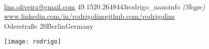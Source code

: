 \documentclass[10pt,a4paper]{article}
\begin{document}

\sloppy  %


\begin{minipage}{.70\linewidth}
\nobreakvspace{0.3em}  %
\\
\href{mailto:lins.oliveira.at.gmail.com}{lins.oliveira\mbox{}@\mbox{}gmail.com}
\sbull\textsmaller{+}49.1520.2648443\sbull rodrigo\_nanoinfo \emph{(Skype)} \\
\href{https://www.linkedin.com/in/rodrigolins}{www.linkedin.com/in/rodrigolins}\sbull\href{https://github.com/rodrigolins}{github.com/rodrigolins} \\
Oderstra{\ss}e 20\sbull Berlin\sbull Germany
\end{minipage}
\hfill
\begin{minipage}{.20\linewidth}
	\begin{flushleft}                            
		\texttt{[image: rodrigo]}
	\end{flushleft} 
\end{minipage}

\spacedhrule{0.9em}{-0.4em}  %

\end{document}
